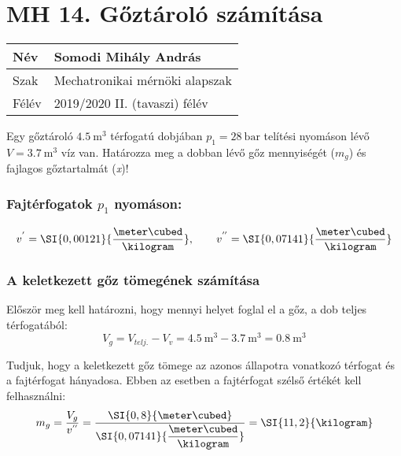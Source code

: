\section*{MH 14. Gőztároló számítása}

\begin{tabular}{ | p{2cm} | p{14cm} | }
	\hline
	Név & Somodi Mihály András \\
	\hline
	Szak & Mechatronikai mérnöki alapszak \\
	\hline
	Félév & 2019/2020 II. (tavaszi) félév \\ 
	\hline
\end{tabular}

\vspace{0.5cm}

\noindent Egy gőztároló $\SI{4,5}{\meter\cubed} $ térfogatú dobjában $p_{1} = \SI{28}{\bar}$ telítési nyomáson lévő $V =\SI{3,7}{\meter\cubed}$ víz van. Határozza meg a dobban lévő gőz mennyiségét ($m_{g}$) és fajlagos gőztartalmát (\textit{x})!

\subsubsection{Fajtérfogatok $p_{1}$ nyomáson:}
 \begin{equation*}
	 v^{'} = \SI{0,00121}{\dfrac{\meter\cubed}{\kilogram}},
	 \qquad
	 v^{''} = \SI{0,07141}{\dfrac{\meter\cubed}{\kilogram}}
\end{equation*}

\noindent\hrulefill

\subsubsection{A keletkezett gőz tömegének számítása}
Először meg kell határozni, hogy mennyi helyet foglal el a gőz, a dob teljes térfogatából:
\begin{equation}
	V_{g} = V_{telj.} - V_{v}
	= 
	\SI{4,5}{\meter\cubed} - \SI{3,7}{\meter\cubed} = \SI{0,8}{\meter\cubed}
\end{equation}

\noindent Tudjuk, hogy a keletkezett gőz tömege az azonos állapotra vonatkozó térfogat és a fajtérfogat hányadosa. Ebben az esetben a fajtérfogat szélső értékét kell felhasználni:
\begin{equation}
	m_{g} = \dfrac{V_{g}}{v^{''}}
	=
    \dfrac{\SI{0,8}{\meter\cubed}}{\SI{0,07141}{\dfrac{\meter\cubed}{\kilogram}}}
    = 
	\SI{11,2}{\kilogram}
\end{equation}


